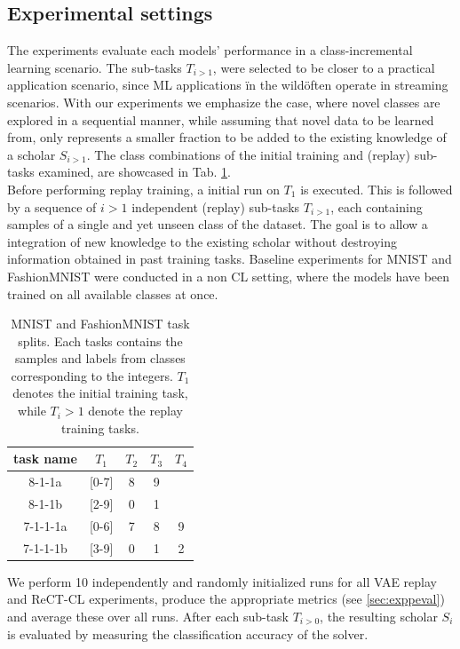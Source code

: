 \documentclass{article} %
\begin{document}
\subsection{Experimental settings}
The experiments evaluate each models' performance in a class-incremental learning scenario. 
The sub-tasks $T_{i>1}$, were selected to be closer to a practical application scenario, since ML applications \"in the wild\" often operate in streaming scenarios. 
%
With our experiments we emphasize the case, where novel classes are explored in a sequential manner, while assuming that novel data to be learned from, only represents a smaller fraction to be added to the existing knowledge of a scholar $S_{i>1}$. 
%
The class combinations of the initial training and (replay) sub-tasks examined, are showcased in Tab. \cref{tab:slts}. 
\\
Before performing replay training, a initial run on $T_1$ is executed. This is followed by a sequence of $i>1$ independent (replay) sub-tasks $T_{i>1}$, each containing samples of a single and yet unseen class of the dataset. The goal is to allow a integration of new knowledge to the existing scholar without destroying information obtained in past training tasks.
%
Baseline experiments for MNIST and FashionMNIST were conducted in a non CL setting, where the models have been trained on all available classes at once.
%
\begin{table}
\caption{MNIST and FashionMNIST task splits. Each tasks contains the samples and labels from classes corresponding to the integers.  $T_1$ denotes the initial training task, while  $T_i>1$ denote the replay training tasks. 
\label{tab:slts}
}
\centering
\begin{tabular}{ c | c | c | c | c }
	task name & $T_1$ & $T_2$ & $T_3$ & $T_4$ \\ [0.5ex]
	\hline
	8-1-1a  	& [0-7] 	& 8 		& 9 		& 		\\
	8-1-1b  	& [2-9] 	& 0 		& 1 		&  		\\
	7-1-1-1a    & [0-6] 	& 7 		& 8 		& 9		\\
 	7-1-1-1b    & [3-9] 	& 0 		& 1 		& 2 
\end{tabular}
\end{table}
%
We perform 10 independently and randomly initialized runs for all VAE replay and ReCT-CL experiments, produce the appropriate metrics (see \cref{sec:exppeval}) and average these over all runs.
%
After each sub-task $T_{i>0}$, the resulting scholar $S_i$ is evaluated by measuring the classification accuracy of the solver. 
\end{document}
